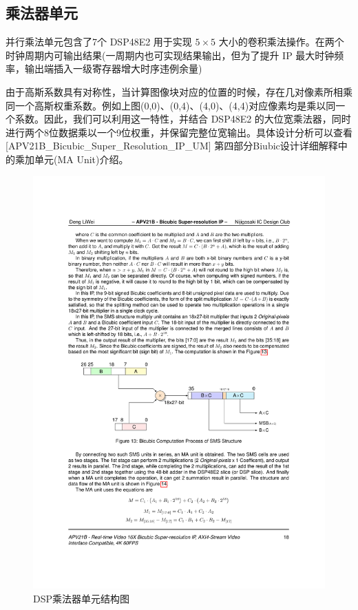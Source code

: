 \documentclass[12pt, a4paper, oneside]{ctexbook}
\begin{document}
	\subsection{乘法器单元} \label{mul_unit}
	并行乘法单元包含了7个 DSP48E2 用于实现 $5\times5$ 大小的卷积乘法操作。在两个时钟周期内可输出结果(一周期内也可实现结果输出，但为了提升 IP 最大时钟频率，输出端插入一级寄存器增大时序违例余量)\par 由于高斯系数具有对称性，当计算图像块对应的位置的时候，存在几对像素所相乘同一个高斯权重系数。例如上图(0,0)、(0,4)、(4,0)、(4,4)对应像素均是乘以同一个系数。因此，我们可以利用这一特性，并结合 DSP48E2 的大位宽乘法器，同时进行两个8位数据乘以一个9位权重，并保留完整位宽输出。具体设计分析可以查看[APV21B\_Bicubic\_Super\_Resolution\_IP\_UM] 第四部分Biubic设计详细解释中的乘加单元(MA Unit)介绍。%
		\begin{figure}[h]
			\centering
			\includegraphics[scale=1]{pic/mul_unit}
			\caption{DSP乘法器单元结构图}
			\label{fig:mulunit}
		\end{figure}
\end{document}
